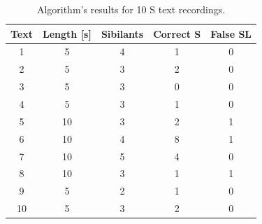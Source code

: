 \documentclass{IEEEtran}
\begin{document}
\centering

\begin{table}[h]
\centering
\caption{Algorithm's results for 10 S text recordings.}\label{resultstables}
\begin{tabular}{ccccc}
Text & Length [s] & Sibilants & Correct S & False SL \\
\hline
1 & 5 & 4 & 1 & 0 \\
2 & 5 & 3 & 2 & 0 \\
3 & 5 & 3 & 0 & 0 \\
4 & 5 & 3 & 1 & 0 \\
5 & 10 & 3 & 2 & 1 \\
6 & 10 & 4 & 8 & 1 \\
7 & 10 & 5 & 4 & 0 \\
8 & 10 & 3 & 1 & 1 \\
9 & 5 & 2 & 1 & 0 \\
10 & 5 & 3 & 2 & 0
\end{tabular}
\end{table}
\end{document}
